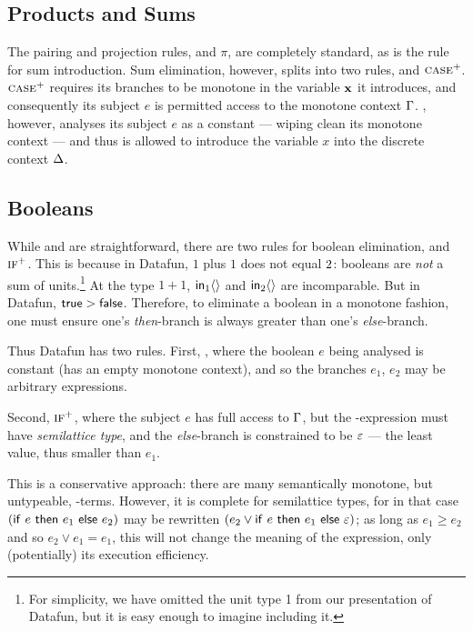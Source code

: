 \subsection{Products and Sums}
The pairing and projection rules,  and $\pi$, are completely standard,
as is the  rule for sum introduction. Sum elimination, however, splits
into two rules,  and $\textsc{case}^+$. $\textsc{case}^+$ requires its branches
to be monotone in the variable $\mathbf{x}$ it introduces, and consequently its
subject $e$ is permitted access to the monotone context $\Gamma$. ,
however, analyses its subject $e$ as a constant --- wiping clean its monotone
context --- and thus is allowed to introduce the variable $x$ into the discrete
context $\Delta$.

\subsection{Booleans}
\label{sec:typing-rules-booleans}

While  and  are straightforward, there are two rules for
boolean elimination,  and $\textsc{if}^+$. This is because in Datafun, $1$
plus $1$ does not equal $2$: booleans are \emph{not} a sum of
units.\footnote{For simplicity, we have omitted the unit type 1 from our
  presentation of Datafun, but it is easy enough to imagine including it.} At
the type $1 + 1$, $\mathsf{in}_1 \langle{}\rangle$ and $\mathsf{in}_2 \langle{}\rangle$ are incomparable. But
in Datafun, $\mathsf{true} > \mathsf{false}$. Therefore, to eliminate a boolean in a
monotone fashion, one must ensure one's \emph{then}-branch is always greater
than one's \emph{else}-branch.

Thus Datafun has two  rules. First, , where the boolean $e$ being
analysed is constant (has an empty monotone context), and so the branches $e_1$,
$e_2$ may be arbitrary expressions.

Second, $\textsc{if}^+$, where the subject $e$ has full access to $\Gamma$, but the
-expression must have \emph{semilattice type}, and the \emph{else}-branch
is constrained to be $\varepsilon$ --- the least value, thus smaller than $e_1$.

This is a conservative approach: there are many semantically monotone, but
untypeable, -terms. However, it is complete for semilattice types, for in
that case $(\mathsf{if}~{e}~\mathsf{then}~{e_1}~\mathsf{else}~{e_2})$ may be rewritten $(e_2 \vee
\mathsf{if}~{e}~\mathsf{then}~{e_1}~\mathsf{else}~{\varepsilon})$; as long as $e_1 \ge e_2$ and so $e_2 \vee e_1 = e_1$,
this will not change the meaning of the expression, only (potentially) its
execution efficiency.


